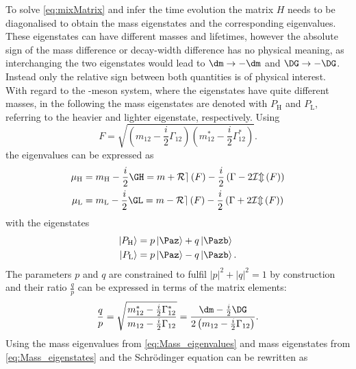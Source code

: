 To solve \cref{eq:mixMatrix} and infer the time evolution the matrix $H$ needs to be diagonalised to obtain the mass eigenstates and the corresponding eigenvalues.
These eigenstates can have different masses and lifetimes, however the absolute sign of the mass difference \dm or decay-width difference \DG has no physical meaning, as interchanging the two eigenstates would lead to $\dm\to-\dm$ and $\DG\to-\DG$.
Instead only the relative sign between both quantities is of physical interest.
With regard to the \Bz-meson system, where the eigenstates have quite different masses, in the following the mass eigenstates are denoted with $P_\text{H}$ and $P_\text{L}$, referring to the heavier and lighter eigenstate, respectively.
Using
\begin{equation}
F=\sqrt{\left(m_{12}-\frac{i}{2}\Gamma_{12}\right)\left(m_{12}^\ast-\frac{i}{2}\Gamma_{12}^\ast\right)}.
\end{equation}
the eigenvalues can be expressed as
\begin{equation}
\begin{split}
\mu_\text{H} &= m_\text{H}-\frac{i}{2}\GH = m + \mathcal{Re}\left(F\right)-\frac{i}{2}\left(\Gamma-2\mathcal{Im}\left(F\right)\right)\\
\mu_\text{L} &= m_\text{L}-\frac{i}{2}\GL = m - \mathcal{Re}\left(F\right)-\frac{i}{2}\left(\Gamma+2\mathcal{Im}\left(F\right)\right)\label{eq:Mass_eigenvalues}
\end{split}
\end{equation}
with the eigenstates
\begin{equation}
\begin{split}
\left|P_\text{H}\right>&= p\left|\Paz\right>+q\left|\Pazb\right>\\
\left|P_\text{L}\right>&= p\left|\Paz\right>-q\left|\Pazb\right>.\label{eq:Mass_eigenstates}
\end{split}
\end{equation}
The parameters $p$ and $q$ are constrained to fulfil $\left|p\right|^2\!+\left|q\right|^2=1$ by construction and their ratio $\frac{q}{p}$ can be expressed in terms of the matrix elements:
\begin{equation}
\frac{q}{p}=\sqrt{ \frac{ m_{12}^\ast-\frac{i}{2}\Gamma_{12}^\ast }{ m_{12}-\frac{i}{2}\Gamma_{12} }}
=\frac{\dm-\frac{i}{2}\DG}{2\left(m_{12}-\frac{i}{2}\Gamma_{12}\right)}.\label{eq:qoverp}
\end{equation}
Using the mass eigenvalues from \cref{eq:Mass_eigenvalues} and mass eigenstates from \cref{eq:Mass_eigenstates} and the Schrödinger equation can be rewritten as
